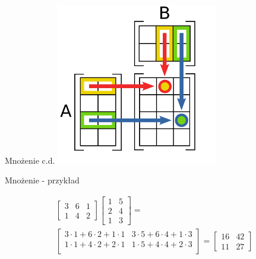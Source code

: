 \documentclass[polish,10pt]{beamer}
\begin{document}
\begin{frame}{Mnożenie c.d.}
    \centering
    \includegraphics[width=200pt]{images/matrix_multi.png}
\end{frame}

\begin{frame}{Mnożenie - przykład}
\begin{example}
    \begin{gather*}
        \begin{bmatrix}
            3 & 6 & 1 \\
            1 & 4 & 2
        \end{bmatrix}
        \begin{bmatrix}
            1 & 5 \\
            2 & 4 \\
            1 & 3
        \end{bmatrix}
        =  \\
        \begin{bmatrix}
            3 \cdot 1 + 6 \cdot 2 + 1 \cdot 1 & 3 \cdot 5 + 6 \cdot 4 + 1 \cdot 3 \\
            1 \cdot 1 + 4 \cdot 2 + 2 \cdot 1 & 1 \cdot 5 + 4 \cdot 4 + 2 \cdot 3 \\
        \end{bmatrix}
        =
        \begin{bmatrix}
            16 & 42 \\
            11 & 27 
        \end{bmatrix}
    \end{gather*}
\end{example}
\end{frame}
\end{document}
